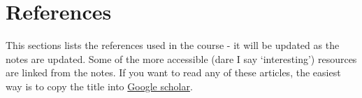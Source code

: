 \documentclass[
  openany]{book}
\theoremstyle{definition}
\theoremstyle{definition}
\theoremstyle{definition}
\theoremstyle{definition}
\theoremstyle{remark}
\begin{document}
\chapter*{References}\label{references}

This sections lists the references used in the course - it will be updated as the notes are updated. Some of the more accessible (dare I say `interesting') resources are linked from the notes. If you want to read any of these articles, the easiest way is to copy the title into \href{https://scholar.google.co.uk/}{Google scholar}.


\end{document}
